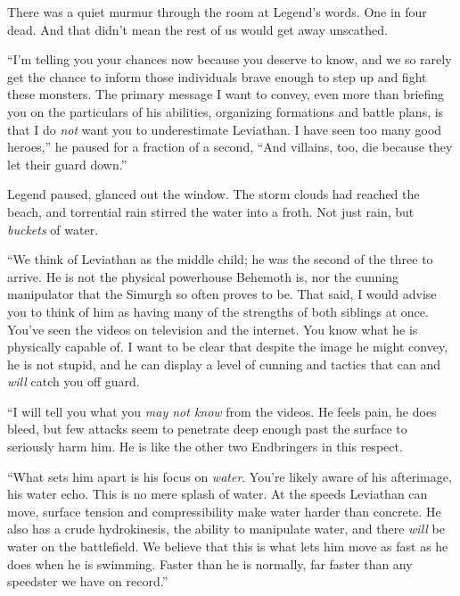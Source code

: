





There was a quiet murmur through the room at Legend's words.  One in four dead.  And that didn't mean the rest of us would get away unscathed.



``I'm telling you your chances now because you deserve to know, and we so rarely get the chance to inform those individuals brave enough to step up and fight these monsters.  The primary message I want to convey, even more than briefing you on the particulars of his abilities, organizing formations and battle plans, is that I do \emph{not} want you to underestimate Leviathan.  I have seen too many good heroes,'' he paused for a fraction of a second, ``And villains, too, die because they let their guard down.''



Legend paused, glanced out the window.  The storm clouds had reached the beach, and torrential rain stirred the water into a froth.  Not just rain, but \emph{buckets }of water.



``We think of Leviathan as the middle child; he was the second of the three to arrive.    He is not the physical powerhouse Behemoth is, nor the cunning manipulator that the Simurgh so often proves to be.  That said, I would advise you to think of him as having many of the strengths of both siblings at once.  You've seen the videos on television and the internet.  You know what he is physically capable of.  I want to be clear that despite the image he might convey, he is not stupid, and he can display a level of cunning and tactics that can and \emph{will }catch you off guard.



``I will tell you what you \emph{may not know} from the videos.  He feels pain, he does bleed, but few attacks seem to penetrate deep enough past the surface to seriously harm him.  He is like the other two Endbringers in this respect.



``What sets him apart is his focus on \emph{water}.  You're likely aware of his afterimage, his water echo.  This is no mere splash of water.  At the speeds Leviathan can move, surface tension and compressibility make water harder than concrete.  He also has a crude hydrokinesis, the ability to manipulate water, and there \emph{will} be water on the battlefield.  We believe that this is what lets him move as fast as he does when he is swimming.  Faster than he is normally, far faster than any speedster we have on record.''



